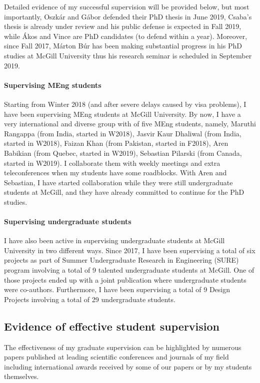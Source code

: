 \documentclass[a4paper,11pt]{report}
\begin{document}
Detailed evidence of my successful supervision will be provided below, but most importantly, Oszkár and Gábor defended 
their PhD thesis in June 2019, Csaba's thesis is already under review and his public defense is expected in Fall 2019, while 
Ákos and Vince are PhD candidates (to defend within a year). Moreover, since Fall 2017, Márton Búr has been making 
substantial progress in his PhD studies at McGill University thus his research seminar is scheduled in September 2019.


\paragraph{Supervising MEng students}
Starting from Winter 2018 (and after severe delays caused by visa problems), I have been supervising MEng students at McGill University. By now, I have a very international and diverse group with of five MEng students, namely, Maruthi Rangappa (from India, started in W2018), Jasvir Kaur Dhaliwal (from India, started in W2018), Faizan Khan (from Pakistan, started in F2018), Aren Babikian (from Quebec, started in W2019), Sebastian Pilarski (from Canada, started in W2019). I collaborate them with weekly meetings and extra teleconferences when my students have some roadblocks. With Aren and Sebastian, I have started collaboration while they were still undergraduate students at McGill, and they have already committed to continue for the PhD studies.  

\paragraph{Supervising undergraduate students}
I have also been active in supervising undergraduate students at McGill University in two different ways.  Since 2017, I have been supervising a total of six projects as part of Summer Undergraduate Research in Engineering (SURE) program involving a total of 9 talented undergraduate students at McGill. One of those projects ended up with a joint publication where undergraduate students were co-authors. Furthermore, I have been supervising a total of 9 Design Projects involving a total of 29 undergraduate students. 

\subsection{Evidence of effective student supervision}

The effectiveness of my graduate supervision can be highlighted by numerous papers published at leading scientific 
conferences and journals of my field including international awards received by some of our papers or by my students 
themselves. 
\end{document}
